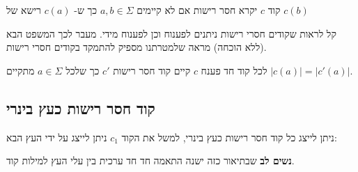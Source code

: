 קוד $c$ יקרא חסר רישות אם לא קיימים
$a,b \in \Sigma$
כך ש-%
$c(a)$
רישא של
$c(b)$

קל לראות שקודים חסרי רישות ניתנים לפענוח וכן לפענוח מידי.
מעבר לכך המשפט הבא (ללא הוכחה) מראה שלמטרתנו מספיק להתמקד בקודים חסרי רישות.
\begin{theorem}
לכל קוד חד פענח $c$ קיים קוד חסר רישות $c'$ כך שלכל 
$a \in \Sigma$
מתקיים
$|c(a)| = |c'(a)|$.
\end{theorem}

\subsection*{קוד חסר רישות כעץ בינרי}
ניתן לייצג כל קוד חסר רישות כעץ בינרי, למשל את הקוד 
$c_1$
ניתן לייצג על ידי העץ הבא:

\begin{center}
\end{center}

\textbf{נשים לב}
שבתיאור כזה ישנה התאמה חד חד ערכית בין עלי העץ למילות קוד.
